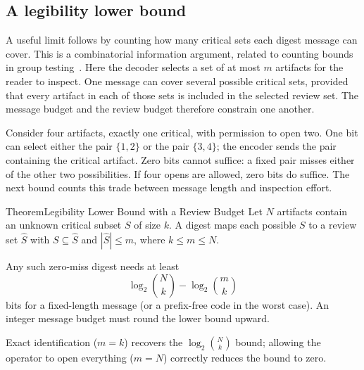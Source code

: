 \documentclass[11pt,a4paper]{article}
\theoremstyle{definition}
\theoremstyle{plain}
\begin{document}
\subsection{A legibility lower bound}\label{sec:lowerbound}

A useful limit follows by counting how many critical sets each digest message
can cover. This is a combinatorial information argument, related to counting
bounds in group testing~. Here the decoder selects a set
of at most $m$ artifacts for the reader to inspect. One message can cover several
possible critical sets, provided that every artifact in each of those sets is
included in the selected review set. The message budget and the review budget
therefore constrain one another.

Consider four artifacts, exactly one critical, with permission to open two. One bit can select either the pair $\{1,2\}$ or the pair $\{3,4\}$; the encoder sends the pair containing the critical artifact. Zero bits cannot suffice: a fixed pair misses either of the other two possibilities. If four opens are allowed, zero bits do suffice. The next bound counts this trade between message length and inspection effort.

%
\begin{pdclaim}{Theorem}{Legibility Lower Bound with a Review Budget}
\setlength{\parskip}{4pt plus 1pt}
\label{thm:lowerbound}
Let $N$ artifacts contain an unknown critical subset $S$ of size $k$. A digest
maps each possible $S$ to a review set $\hat S$ with $S\subseteq\hat S$ and
$|\hat S|\le m$, where $k\le m\le N$.

Any such zero-miss digest needs at least
\[
\log_2\!\binom{N}{k}-\log_2\!\binom{m}{k}
\]
bits for a fixed-length message (or a prefix-free code in the worst case).
An integer message budget must round the lower bound upward.

Exact identification ($m=k$) recovers the
$\log_2\binom Nk$ bound; allowing the operator to open everything ($m=N$) correctly
reduces the bound to zero.
\end{pdclaim}
\end{document}
